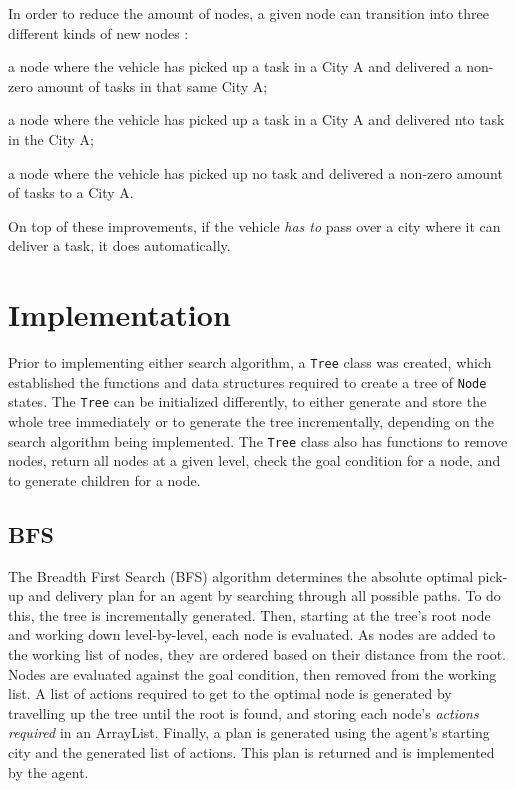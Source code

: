 \documentclass[11pt]{article}
\begin{document}
In order to reduce the amount of nodes, a given node can transition into three different kinds of new nodes : 

\begin{compactenum}
	\item a node where the vehicle has picked up a task in a City A and delivered a non-zero amount of tasks in that same City A;
	\item a node where the vehicle has picked up a task in a City A and delivered nto task in the City A;                                                                   	\item a node where the vehicle has picked up no task and delivered a non-zero amount of tasks to a City A.\\
\end{compactenum}

On top of these improvements, if the vehicle \textit{has to} pass over a city where it can deliver a task, it does automatically.

\section{Implementation}
Prior to implementing either search algorithm, a \texttt{Tree} class was created, which established the functions and data structures required to create a tree of \texttt{Node} states. The \texttt{Tree} can be initialized differently, to either generate and store the whole tree immediately or to generate the tree incrementally, depending on the search algorithm being implemented. The \texttt{Tree} class also has functions to remove nodes, return all nodes at a given level, check the goal condition for a node, and to generate children for a node. 

\subsection{BFS}
The Breadth First Search (BFS) algorithm determines the absolute optimal pick-up and delivery plan for an agent by searching through all possible paths. To do this, the tree is incrementally generated. Then, starting at the tree's root node and working down level-by-level, each node is evaluated. As nodes are added to the working list of nodes, they are ordered based on their distance from the root. Nodes are evaluated against the goal condition, then removed from the working list. A list of actions required to get to the optimal node is generated by travelling up the tree until the root is found, and storing each node's \textit{actions required} in an ArrayList. Finally, a plan is generated using the agent's starting city and the generated list of actions. This plan is returned and is implemented by the agent. 
\end{document}
